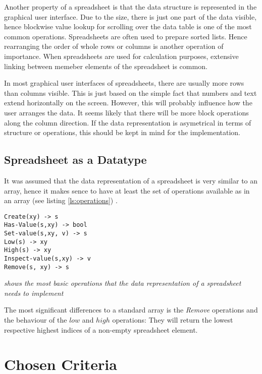 \documentclass[a4paper,11pt,twoside]{article}
\begin{document}
Another property of a spreadsheet is that the data
structure is represented in the graphical user interface. Due to the
size, there is just one part of the data visible, hence blockwise
value lookup for scrolling over the data table is one of the most
common operations. Spreadsheets are often used to prepare sorted
lists. Hence rearranging the order of whole rows or columns is another
operation of importance. When spreadsheets are used for calculation
purposes, extensive linking between memeber elements of the
spreadsheet is common.

In most graphical user interfaces of spreadsheets, there are usually
more rows than columns visible. This is just based on the simple fact
that numbers and text extend horizontally on the screen. However, this
will probably influence how the user arranges the data. It seems
likely that there will be more block operations along the column
direction. If the data representation is asymetrical in
terms of structure or operations, this should be kept in mind for the
implementation.  

\subsection{Spreadsheet as a Datatype}
It was assumed that the data representation of a spreadsheet is very
similar to an array, hence it makes sence to have at least the set of
operations available as in an array (see listing \ref{ls:operations})
\cite[pp. 92-95]{janlert2000}.

\begin{listing}
\begin{verbatim}
Create(xy) -> s
Has-Value(s,xy) -> bool
Set-value(s,xy, v) -> s
Low(s) -> xy
High(s) -> xy
Inspect-value(s,xy) -> v
Remove(s, xy) -> s
\end{verbatim}
\caption{\textit{shows the most basic operations that the data
  representation of a spreadsheet needs to implement \label{ls:operations}}}
\end{listing}

The most significant differences to a standard array is the
\textit{Remove} operations and the behaviour of the $low$ and $high$
operations: They will return the lowest respective highest indices of
a non-empty spreadsheet element. 

\section{Chosen Criteria}
\end{document}
